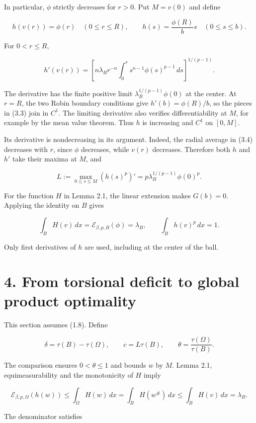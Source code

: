 \documentclass[11pt]{article}
\begin{document}
In particular, \(\phi\) strictly decreases for \(r>0\). Put \(M=v(0)\)
and define

\[h(v(r))=\phi(r)\quad(0\leq r\leq R),
\qquad h(s)=\frac{\phi(R)}b s\quad(0\leq s\leq b).\tag{3.3}\]

For \(0<r\leq R\),

\[h'(v(r))=
\left[n\lambda_B r^{-n}\int_0^r s^{n-1}\phi(s)^{p-1}\,ds\right]^{1/(p-1)}.\tag{3.4}\]

The derivative has the finite positive limit
\(\lambda_B^{1/(p-1)}\phi(0)\) at the center. At \(r=R\), the two Robin
boundary conditions give \(h'(b)=\phi(R)/b\), so the pieces in (3.3)
join in \(C^1\). The limiting derivative also verifies differentiability
at \(M\), for example by the mean value theorem. Thus \(h\) is
increasing and \(C^1\) on \([0,M]\).

Its derivative is nondecreasing in its argument. Indeed, the radial
average in (3.4) decreases with \(r\), since \(\phi\) decreases, while
\(v(r)\) decreases. Therefore both \(h\) and \(h'\) take their maxima at
\(M\), and

\[L:=\max_{0\leq s\leq M}(h(s)^p)'
=p\lambda_B^{1/(p-1)}\phi(0)^p.\tag{3.5}\]

For the function \(H\) in Lemma 2.1, the linear extension makes
\(G(b)=0\). Applying the identity on \(B\) gives

\[\int_B H(v)\,dx=\mathcal E_{\beta,p,B}(\phi)=\lambda_B,
\qquad \int_B h(v)^p\,dx=1.\tag{3.6}\]

Only first derivatives of \(h\) are used, including at the center of the
ball.

\section{4. From torsional deficit to global product
optimality}\label{from-torsional-deficit-to-global-product-optimality}

This section assumes (1.8). Define

\[\delta=\tau(B)-\tau(\Omega),\qquad c=L\tau(B),
\qquad\theta=\frac{\tau(\Omega)}{\tau(B)}.\tag{4.1}\]

The comparison ensures \(0<\theta\leq1\) and bounds \(w\) by \(M\).
Lemma 2.1, equimeasurability and the monotonicity of \(H\) imply

\[\mathcal E_{\beta,p,\Omega}(h(w))
\leq\int_\Omega H(w)\,dx
=\int_B H(w^\#)\,dx
\leq\int_B H(v)\,dx=\lambda_B.\tag{4.2}\]

The denominator satisfies
\end{document}

